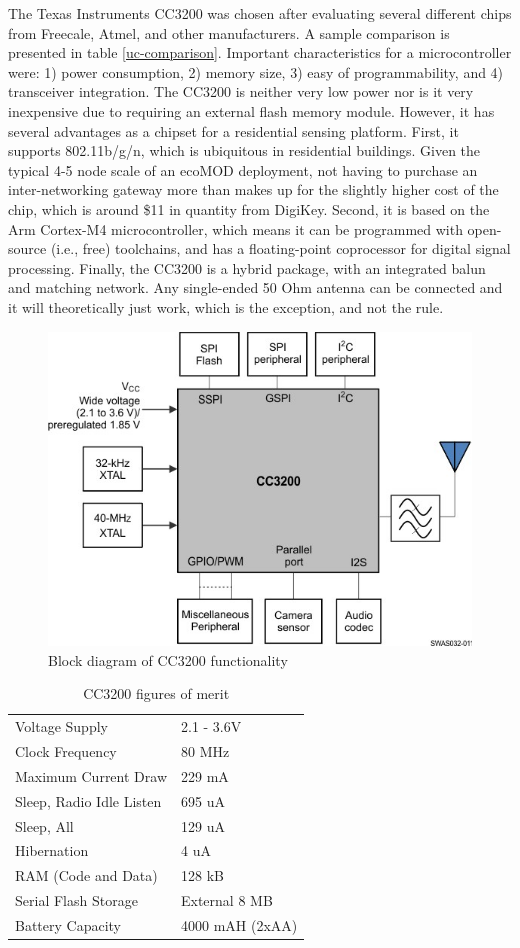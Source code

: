 The Texas Instruments CC3200 was chosen after evaluating several different chips from Freecale, Atmel, and other manufacturers. A sample comparison is presented in table \ref{uc-comparison}. Important characteristics for a microcontroller were: 1) power consumption, 2) memory size, 3) easy of programmability, and 4) transceiver integration. The CC3200 is neither very low power nor is it very inexpensive due to requiring an external flash memory module. However, it has several advantages as a chipset for a residential sensing platform. First, it supports 802.11b/g/n, which is ubiquitous in residential buildings. Given the typical 4-5 node scale of an ecoMOD deployment, not having to purchase an inter-networking gateway more than makes up for the slightly higher cost of the chip, which is around \$11 in quantity from DigiKey. Second, it is based on the Arm Cortex-M4 microcontroller, which means it can be programmed with open-source (i.e., free) toolchains, and has a floating-point coprocessor for digital signal processing. Finally, the CC3200 is a hybrid package, with an integrated balun and matching network. Any single-ended 50 Ohm antenna can be connected and it will theoretically just work, which is the exception, and not the rule.

\begin{figure}[h]
\centering
\includegraphics[width=0.5\linewidth]{images/cc3200-block}
\caption[CC3200 Block Diagram]{Block diagram of CC3200 functionality\cite{2015}}
\label{fig:cc3200-block}
\end{figure}

\begin{table}[h]
\caption{CC3200 figures of merit}
\label{CC3200-fom}
\begin{tabular}{ll}
Voltage Supply           & 2.1 - 3.6V \\
Clock Frequency          & 80 MHz     \\
Maximum Current Draw     & 229 mA     \\
Sleep, Radio Idle Listen & 695 uA     \\
Sleep, All               & 129 uA \\
Hibernation              & 4 uA     \\
RAM (Code and Data)      & 128 kB     \\
Serial Flash Storage     & External 8 MB		\\
Battery Capacity		 & 4000 mAH (2xAA)	      
\end{tabular}
\end{table}

